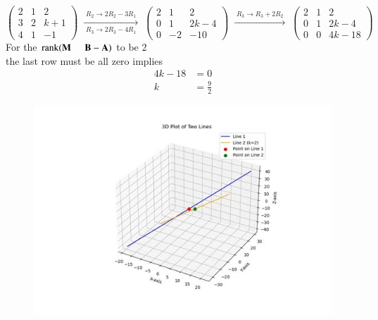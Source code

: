 \documentclass[journal]{IEEEtran}
\begin{document}
\[
\begin{pmatrix}
2 & 1 & 2\\
3 & 2 & k+1\\
4 & 1 & -1
\end{pmatrix}
\;\xrightarrow[\;R_3 \to 2R_3 - 4R_1\;]{\;R_2 \to 2R_2 - 3R_1\;}\;
\begin{pmatrix}
2 & 1 & 2\\
0 & 1 & 2k-4\\
0 & -2 & -10
\end{pmatrix}
\;\xrightarrow[\;]{\;R_3 \to R_3 + 2R_2\;}\;
\begin{pmatrix}
2 & 1 & 2\\
0 & 1 & 2k-4\\
0 & 0 & 4k-18
\end{pmatrix}
\]
For the $\operatorname{rank}(\vec{M} \hspace{5mm}  \vec{B-A})$ to be 2\\
the last row must be all zero implies\\
\begin{align}
4k-18&=0\\
k&=\tfrac{9}{2}
\end{align}
\begin{figure}[h]
    \centering
\includegraphics[scale=0.5]{figs/4.13.85.png}
    \caption{}
    \label{fig:1}
\end{figure}
\end{document}
